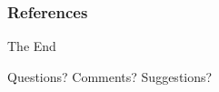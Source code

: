 \documentclass[10pt]{beamer}
\begin{document}
\begin{frame}[allowframebreaks] %
	\frametitle{References}
	
		
			

\printbibliography
\end{frame}



\begin{frame}[allowframebreaks] %
	\begin{center}
		{\Huge The End}
		
		\bigskip\bigskip %
		
		{\LARGE Questions? Comments? Suggestions?}
	\end{center}
\end{frame}

\end{document}
